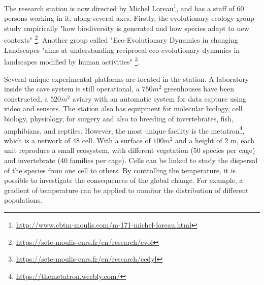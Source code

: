 \documentclass{article}
\begin{document}
The research station is now directed by Michel Loreau\footnote{\url{http://www.cbtm-moulis.com/m-171-michel-loreau.html}}, and has a staff of 60 persons working in it, along several axes. 
Firstly, the evolutionary ecology group study empirically "how biodiversity is generated and how species adapt to new contexts" \footnote{\url{https://sete-moulis-cnrs.fr/en/research/evol}}. Another group called "Eco-Evolutionary Dynamics in changing Landscapes "aims at understanding reciprocal eco-evolutionary dynamics in landscapes modified by human activities" \footnote{\url{https://sete-moulis-cnrs.fr/en/research/eedyl}}.



Several unique experimental platforms are located in the station. A laboratory inside the cave system is still operational, a $750m^2$ greenhouses have been constructed, a $520m^2$ aviary with an automatic system for data capture using video and sensors.
The station also has equipment for molecular biology, cell biology, physiology, for surgery and also to breeding of invertebrates, fish, amphibians, and reptiles. However, the most unique facility is the metatron\footnote{\url{https://themetatron.weebly.com/}}, which is a network of 48 cell.  
With a surface of $100m^2$ and a height of 2 m, each unit reproduce a small ecosystem, with different vegetation (50 species per cage) and invertebrate (40 families per cage). Cells can be linked to study the dispersal of the species from one cell to others. By controlling the temperature, it is possible to investigate the consequences of the global change. For example, a gradient of temperature can be applied to monitor the distribution of different populations.
\end{document}

